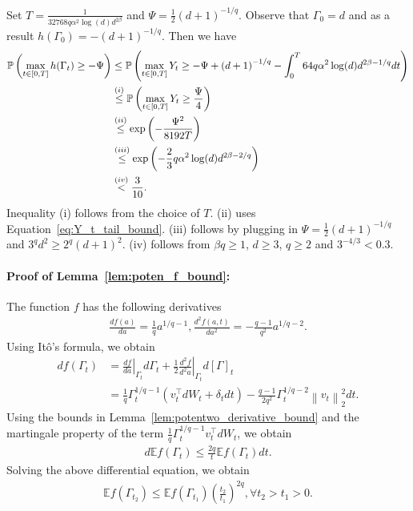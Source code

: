 \documentclass[11pt,twoside]{article}
\newcommand{\potentwo}{\Gamma}
\theoremstyle{named}
\theoremstyle{plain}
\newcommand{\vecnorm}[2]{\left\| #1\right\|_{#2}}
\newcommand{\Exs}{\ensuremath{{\mathbb{E}}}}
\newcommand{\Prob}{\ensuremath{{\mathbb{P}}}}
\newcommand{\usedim}{\ensuremath{d}}
\newcommand{\dims}{\usedim}
\newcommand{\brackets}[1]{\left[ #1 \right]}
\newcommand{\parenth}[1]{\left( #1 \right)}
\newcommand{\tp}{^\top}
\begin{document}
Set $T = \frac{1}{32768 q \alpha^2 \log(\dims) d^{2\beta}}$ and $\Psi = \frac{1}{2} \parenth{\dims+1}^{-1/q}$. Observe that $\potentwo_0 = \dims$ and as a result $h(\potentwo_0) = -\parenth{\dims+1}^{-1/q}$. Then we have
\begin{align*}
  \Prob \parenth{\max_{t \in [0, T]}  h(\potentwo_t) \geq -\Psi}
  &\leq \Prob \parenth{\max_{t \in [0, T]}  Y_t \geq -\Psi + \parenth{\dims+1}^{-1/q} - \int_0^T 64q \alpha^2 \log(\dims) d^{2\beta - 1/q} dt }\\
  &\stackrel{(i)}{\leq} \Prob \parenth{\max_{t \in [0, T]}  Y_t \geq \frac{\Psi}{4}} \\
  &\stackrel{(ii)}{\leq} \exp\parenth{-\frac{\Psi^2}{8192T}} \\
  &\stackrel{(iii)}{\leq} \exp\parenth{-\frac{2}{3} q \alpha^2 \log(\dims) \dims^{2\beta - 2/q}} \notag \\
  &\stackrel{(iv)}{<} \frac{3}{10}.
\end{align*}
Inequality (i) follows from the choice of $T$. (ii) uses Equation~\eqref{eq:Y_t_tail_bound}. (iii) follows by plugging in $\Psi = \frac{1}{2}\parenth{\dims+1}^{-1/q}$ and $3^q \dims^2 \geq 2^q (\dims + 1)^2$. (iv) follows from $\beta q \geq 1$, $\dims \geq 3$, $q\geq 2$ and $3^{-4/3} < 0.3$.

\paragraph{Proof of Lemma~\ref{lem:poten_f_bound}:} The function $f$ has the following derivatives
\begin{align*}
  \frac{d f(a)}{d a} = \frac{1}{q} a^{1/q-1}, \frac{d^2 f(a, t)}{d a^2} = -\frac{q-1}{q^2} a^{1/q-2}.
\end{align*}
Using It\^o's formula, we obtain
\begin{align*}
  d f\parenth{\potentwo_t} &= \left.\frac{df}{da} \right|_{\potentwo_t} d\potentwo_t + \frac{1}{2} \left.\frac{d^2 f}{ d^2 a }\right|_{\potentwo_t} d \brackets{\potentwo}_t \\
  &= \frac{1}{q} \potentwo_t^{1/q-1} \parenth{v_t\tp dW_t + \delta_t dt} - \frac{q-1}{2q^2} \potentwo_t^{1/q-2} \vecnorm{v_t}{2}^2 dt.
\end{align*}
Using the bounds in Lemma~\ref{lem:potentwo_derivative_bound} and the martingale property of the term $\frac{1}{q} \potentwo_t^{1/q-1} v_t\tp dW_t$, we obtain
\begin{align*}
  d \Exs f(\potentwo_t) \leq \frac{2q}{t} \Exs f(\potentwo_t) dt.
\end{align*}
Solving the above differential equation, we obtain
\begin{align*}
  \Exs f(\potentwo_{t_2}) \leq \Exs f(\potentwo_{t_1}) \parenth{\frac{t_2}{t_1}}^{2q}, \forall t_2 > t_1 > 0.
\end{align*}
\end{document}
